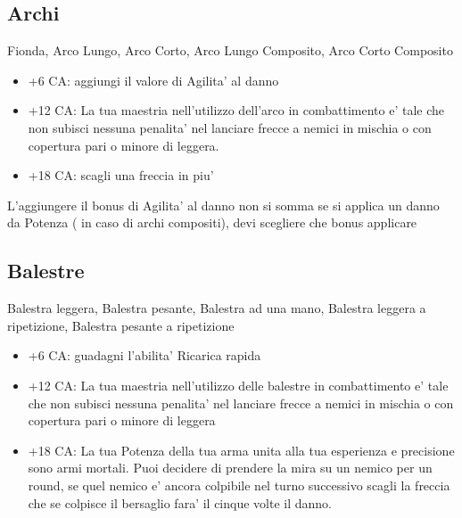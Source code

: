 \documentclass[a4paper,11pt,twoside,openany]{book}
\begin{document}
	\subsection{Archi} Fionda, Arco Lungo, Arco Corto, Arco Lungo Composito, Arco Corto Composito
	
	\begin{itemize}
		
		\item +6 CA: aggiungi il valore di Agilita' al danno
		
		\item +12 CA: La tua maestria nell'utilizzo dell'arco in combattimento e' tale che non subisci nessuna penalita' nel lanciare frecce a nemici in mischia o con copertura pari o minore di leggera.
		
		\item +18 CA: scagli una freccia in piu'
		
	\end{itemize}
	
	L'aggiungere il bonus di Agilita' al danno non si somma se si applica un danno da Potenza ( in caso di archi compositi), devi scegliere che bonus applicare
	
	\subsection{Balestre}Balestra leggera, Balestra pesante, Balestra ad una mano, Balestra leggera a ripetizione, Balestra pesante a ripetizione
	
	\begin{itemize}
		
		\item +6 CA: guadagni l'abilita' Ricarica rapida
		
		\item +12 CA: La tua maestria nell'utilizzo delle balestre in combattimento e' tale che non subisci nessuna penalita' nel lanciare frecce a nemici in mischia o con copertura pari o minore di leggera
		
		\item +18 CA: La tua Potenza della tua arma unita alla tua esperienza e precisione sono armi mortali. Puoi decidere di prendere la mira su un nemico per un round, se quel nemico e' ancora colpibile nel turno successivo scagli la freccia che se colpisce il bersaglio fara' il cinque volte il danno.
		
	\end{itemize}
	
\end{document}
